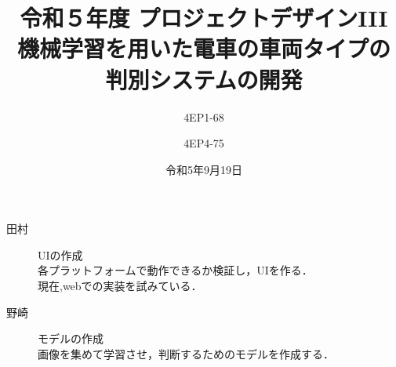 % 
%

\title{
{\normalsize 令和５年度 プロジェクトデザインIII}\\\vspace{10mm}
{\LARGE 機械学習を用いた電車の車両タイプの\\判別システムの開発}
}
\date{令和5年9月19日}
\author{
4EP1-68\\  \and
4EP4-75\\  
}



\usepackage{subcaption}
\usepackage{comment}



\maketitle %
\addtocounter{page}{1}
\thispagestyle{myfirstpage}

\begin{description}
	\item [田村] UIの作成~\\
	各プラットフォームで動作できるか検証し，UIを作る．\\
	現在,webでの実装を試みている．
	
	\item [野崎] モデルの作成~\\
	画像を集めて学習させ，判断するためのモデルを作成する．
	
\end{description}



